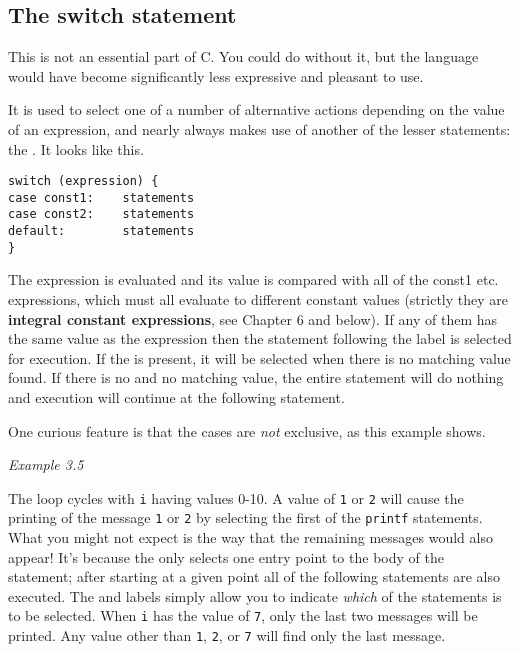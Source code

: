   

  \subsection{The switch statement}
   

   This is not an essential part of C. You could do without it, but
    the language would have become significantly less expressive and pleasant
    to use.


   It is used to select one of a number of alternative actions depending on
    the value of an expression, and nearly always makes use of another of the
    lesser statements: the \kbreak. It looks like this.


   \begin{Verbatim}
switch (expression) {
case const1:    statements
case const2:    statements
default:        statements
}
\end{Verbatim}

   The expression is evaluated and its value is compared with
    all of the const1 etc. expressions, which must all evaluate
    to different constant values (strictly they are \textbf{integral constant
    expressions}, see Chapter 6 and below). If any of them
    has the same value as the expression then the statement
    following the \case{} label is selected for execution. If the
     is present, it will be selected when there is no
    matching value found. If there is no  and no matching
    value, the entire \switch{} statement will do nothing and
    execution will continue at the following statement.


   One curious feature is that the cases are \textit{not} exclusive, as
    this example shows.


    \begin{center}\textit{Example 3.5}\end{center}


   The loop cycles with \texttt{i} having values 0-10. A value of
    \texttt{1} or \texttt{2} will cause the printing of the message
    \texttt{1} or \texttt{2} by selecting the first of the
    \texttt{printf} statements. What you might not expect is the way that
    the remaining messages would also appear! It's because the
    \switch{} only selects one entry point to the body of the
    statement; after starting at a given point all of the following statements
    are also executed. The \case{} and  labels
    simply allow you to indicate \textit{which} of the statements is to be
    selected. When \texttt{i} has the value of \texttt{7}, only the
    last two messages will be printed. Any value other than \texttt{1},
    \texttt{2}, or \texttt{7} will find only the last message.


